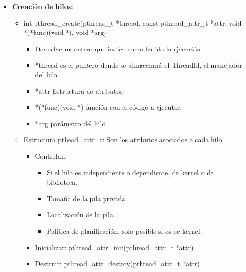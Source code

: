 \documentclass[12pt, twoside, openright]{report} %
\begin{document}
  \begin{itemize}
  \item \textbf{Creación de hilos:}
    

    \begin{itemize}
    \item int pthread\_create(pthread\_t *thread, const pthread\_attr\_t
      *attr, void *(*func)(void *), void *arg)
      

      \begin{itemize}
      \item Devuelve un entero que indica como ha ido la ejecución.
        
      \item *thread es el puntero donde se almacenará el ThreadId, el
        manejador del hilo.
        
      \item *attr Estructura de atributos.
        
      \item *(*func)(void *) función con el código a ejecutar.
        
      \item *arg parámetro del hilo.
        
      \end{itemize}
	  \pagebreak
    \item Estructura pthead\_attr\_t: Son los atributos asociados a cada
      hilo.
      

      \begin{itemize}
      \item Controlan:
        

        \begin{itemize}
        \item Si el hilo es independiente o dependiente, de kernel o de
          biblioteca.
          
        \item Tamaño de la pila privada.
          
        \item Localización de la pila.
          
        \item Política de planificación, solo posible si es de kernel.
          
        \end{itemize}
      \item Inicializar: pthread\_attr\_init(pthread\_attr\_t *attr)
        
      \item Destruir: pthread\_attr\_destroy(pthread\_attr\_t *attr)
        

\end{itemize}
\end{itemize}
\end{itemize}
\end{document}

